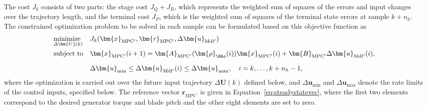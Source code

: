 The cost \( J_k \) consists of two parts: the stage cost $J_Q + J_R$, which represents the weighted sum of squares of the errors and input changes over the trajectory length, and the terminal cost $J_P$, which is the weighted sum of squares of the terminal state errors at sample $k+n_h$.
The constrained optimization problem to be solved in each sample can be formulated based on this objective function as
\begin{align} \label{eq:ObjFunWT}
    \begin{array}{ll}
        \underset{\Delta \bm{U}(k)}{\text{minimize }} & J_k(\bm{x}_{\text{MPC}^\prime}, \bm{r}_{\text{MPC}^\prime}, \Delta \bm{u}_{\text{Mdl}^\prime}) \\[10pt]
        \text{subject to} & \bm{x}_{\text{MPC}^\prime}(i+1) = \bm{A}_{\text{MPC}^\prime}(\bm{\rho}_{\Rho}(i)) \bm{x}_{\text{MPC}^\prime}(i) + \bm{B}_{\text{MPC}^\prime} \Delta \bm{u}_{\text{Mdl}^\prime}(i), \\[10pt]
        & \Delta\bm{u}_{\text{min}} \leq \Delta \bm{u}_{\text{Mdl}^\prime}(i) \leq \Delta\bm{u}_{\text{max}}, \quad i = k, \dots, k+n_h-1,
    \end{array}
\end{align}
where the optimization is carried out over the future input trajectory $\Delta\bm{U}(k)$ defined below, and $\Delta\bm{u}_{\text{min}}$ and $\Delta\bm{u}_{\text{max}}$ denote the rate limits of the control inputs, specified below. The reference vector $\bm{r}_{\text{MPC}^\prime}$ is given in Equation~\eqref{eq:steadystatevec}, where the first two elements correspond to the desired generator torque and blade pitch and the other eight elements are set to zero.

